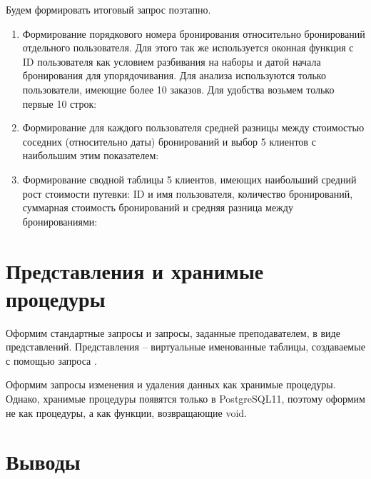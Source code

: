 Будем формировать итоговый запрос поэтапно.

\begin{enumerate}[leftmargin=0em]
	\item Формирование порядкового номера бронирования относительно бронирований отдельного пользователя. Для этого так же используется оконная функция  с ID пользователя как условием разбивания на наборы и датой начала бронирования для упорядочивания. Для анализа используются только пользователи, имеющие более 10 заказов. Для удобства возьмем только первые 10 строк:
	
	\item Формирование для каждого пользователя средней разницы между стоимостью соседних (относительно даты) бронирований и выбор 5 клиентов с наибольшим этим показателем: 
	
	\item Формирование сводной таблицы 5 клиентов, имеющих наибольший средний рост стоимости путевки: ID и имя пользователя, количество бронирований, суммарная стоимость бронирований и средняя разница между бронированиями:
\end{enumerate}

\section{Представления и хранимые процедуры}

Оформим стандартные запросы и запросы, заданные преподавателем, в виде представлений. Представления -- виртуальные именованные таблицы, создаваемые с помощью запроса .



Оформим запросы изменения и удаления данных как хранимые процедуры. Однако, хранимые процедуры появятся только в PostgreSQL11, поэтому оформим не как процедуры, а как функции, возвращающие void.



\section{Выводы}

